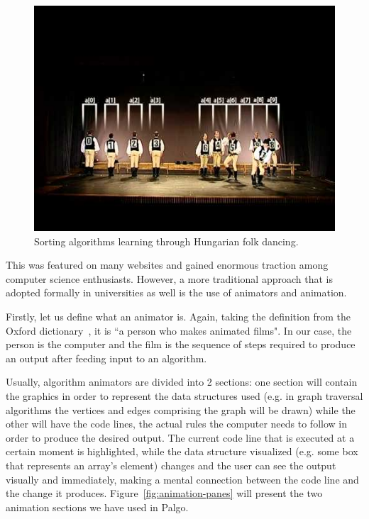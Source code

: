 \documentclass{l4proj}
\begin{document}
\pagebreak

\begin{figure}[!ht]
\centering
\includegraphics[scale=0.6]{quicksort}
\caption{Sorting algorithms learning through Hungarian folk dancing.}
\label{fig:quicksort}
\end{figure}

This was featured on many websites and gained enormous traction among computer science enthusiasts. However, a more
traditional approach that is adopted formally in universities as well is the use of animators and animation.

Firstly, let us define what an animator is. Again, taking the definition from the Oxford dictionary~\cite{oxford-dict},
it is ``a person who makes animated films". In our case, the person is the computer and the film is the sequence of steps required to produce an output after feeding input to an algorithm.

Usually, algorithm animators are divided into 2 sections: one section will contain the graphics in order to represent the
data structures used (e.g. in graph traversal algorithms the vertices and edges comprising the graph will be drawn) while
the other will have the code lines, the actual rules the computer needs to follow in order to produce the desired
output. The current code line that is executed at a certain moment is highlighted, while the data structure visualized
(e.g. some box that represents an array's element) changes and the user can see the output visually and immediately,
making a mental connection between the code line and the change it produces. Figure~\ref{fig:animation-panes} will present the two animation sections we have used in Palgo. 
\end{document}
